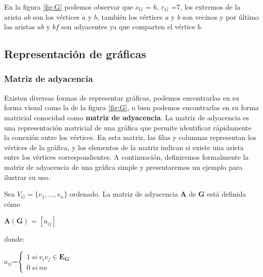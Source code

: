 \begin{flushleft}

En la figura \ref{fig:G} podemos observar que $\nu_{G}$ = 6, $\varepsilon_{G}$ =7, los extremos de la arista $ab$ son los vértices $a$ y $b$, también los vértices $a$ y $b$ son vecinos y por último las aristas $ab$ y $bf$ son adyacentes ya que comparten el vértice $b$.
\end{flushleft}

\subsection{Representación de gráficas}
\subsubsection{Matriz de adyacencia}

Existen diversas formas de representar gráficas, podemos encontrarlas en su forma visual como la de la figura \ref{fig:G}, o bien podemos encontrarlas en su forma matricial conocidad como \textbf{matriz de adyacencia}. 
La matriz de adyacencia es una representación matricial de una gráfica que permite identificar rápidamente la conexión entre los vértices. En esta matriz, las filas y columnas representan los vértices de la gráfica, y los elementos de la matriz indican si existe una arista entre los vértices correspondientes.
A continuación, definiremos formalmente la matriz de adyacencia de una gráfica simple y presentaremos un ejemplo para ilustrar su uso.

\begin{definition}
    Sea $V_G = \{v_1,...,v_n\}$ ordenado. 
    La matriz de adyacencia $\mathbf{A}$ de $\mathbf{G}$ está definida cómo \begin{center}
        $\mathbf{A}(\mathbf{G})$ = $\left[a_{ij}\right]$
    \end{center}
    donde:
    \begin{center}
        $a_{ij}$=$\left\lbrace\begin{array}{c} 1~si~v_iv_j \in \mathbf{E_G} \\0~si~no \end{array}\right.$
    \end{center}
\end{definition}

